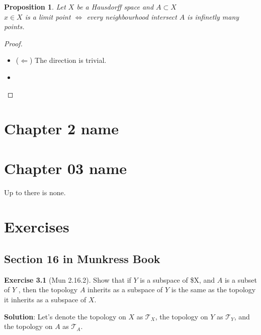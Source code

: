 \documentclass[
]{book}
\providecommand{\tightlist}{%
  \setlength{\itemsep}{0pt}\setlength{\parskip}{0pt}}
\newtheorem{proposition}{Proposition}[chapter]
\theoremstyle{definition}
\theoremstyle{definition}
\theoremstyle{definition}
\newtheorem{exercise}{Exercise}[chapter]
\theoremstyle{definition}
\theoremstyle{remark}
\begin{document}
\begin{proposition}
\protect\hypertarget{prp:unnamed-chunk-79}{}\label{prp:unnamed-chunk-79}Let \(X\) be a Hausdorff space and \(A\subset X\)\\
\(x\in X\) is a limit point \(\iff\) every neighbourhood intersect \(A\) is infinetly many points.
\end{proposition}

\begin{proof}
\leavevmode

\begin{itemize}
\tightlist
\item
  (\(\Longleftarrow\)) The direction is trivial.
\item
\end{itemize}

\end{proof}

\hypertarget{chapter-2-name}{%
\chapter{Chapter 2 name}\label{chapter-2-name}}

\hypertarget{chapter-03-name}{%
\chapter{Chapter 03 name}\label{chapter-03-name}}

Up to there is none.

\hypertarget{exercises}{%
\chapter{Exercises}\label{exercises}}

\hypertarget{section-16-in-munkress-book}{%
\section{Section 16 in Munkress Book}\label{section-16-in-munkress-book}}

\begin{exercise}[Mun 2.16.2]
\protect\hypertarget{exr:unnamed-chunk-81}{}\label{exr:unnamed-chunk-81}Show that if \(Y\) is a subspace of \$X, and \(A\) is a subset of \(Y\) , then the topology \(A\) inherits as a subspace of \(Y\) is the same as the topology it inherits as a subspace of \(X\).
\end{exercise}

\textbf{Solution}:
Let's denote the topology on \(X\) as \(\mathcal{T}_X\), the topology on \(Y\) as \(\mathcal{T}_Y\), and the topology on \(A\) as \(\mathcal{T}_A\).
\end{document}
